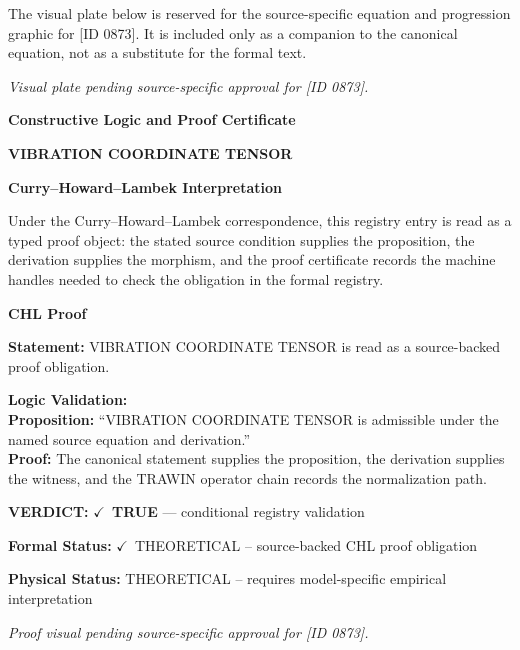 \begingroup\footnotesize\sloppy
The visual plate below is reserved for the source-specific equation and progression graphic for [ID 0873]. It is included only as a companion to the canonical equation, not as a substitute for the formal text.
\par\endgroup
\begingroup\footnotesize\itshape
Visual plate pending source-specific approval for [ID 0873].
\par\endgroup

\clearpage
\begingroup\tzpsupportsetup
\noindent\textbf{\fontsize{10.8pt}{12.8pt}\selectfont [ID 0873] Constructive Logic and Proof Certificate}\par
\noindent\textbf{\fontsize{10pt}{12pt}\selectfont VIBRATION COORDINATE TENSOR}\par
\vspace{0.45em}
\begingroup
\footnotesize
\setlength{\parskip}{0.22em}
\setlength{\parindent}{0pt}
\noindent\textbf{Curry--Howard--Lambek Interpretation}\par
Under the Curry--Howard--Lambek correspondence, this registry entry is read as a typed proof
object: the stated source condition supplies the proposition, the derivation supplies the
morphism, and the proof certificate records the machine handles needed to check the obligation
in the formal registry.

\vspace{0.45em}
\noindent\textbf{CHL Proof}\par
\textbf{Statement:} VIBRATION COORDINATE TENSOR is read as a source-backed proof obligation.

\textbf{Logic Validation:}\\
\textbf{Proposition:} ``VIBRATION COORDINATE TENSOR is admissible under the named source equation and derivation.''\\
\textbf{Proof:} The canonical statement supplies the proposition, the derivation supplies the witness, and the TRAWIN operator chain records the normalization path.

\textbf{VERDICT:} \ensuremath{\checkmark}\ \textbf{TRUE} --- conditional registry validation

\textbf{Formal Status:} \ensuremath{\checkmark}\ THEORETICAL -- source-backed CHL proof obligation

\textbf{Physical Status:} THEORETICAL -- requires model-specific empirical interpretation
\par\vspace{0.45em}
\par
\vfill
\begingroup\footnotesize\itshape
Proof visual pending source-specific approval for [ID 0873].
\par\endgroup
\vfill
\endgroup
\endgroup
